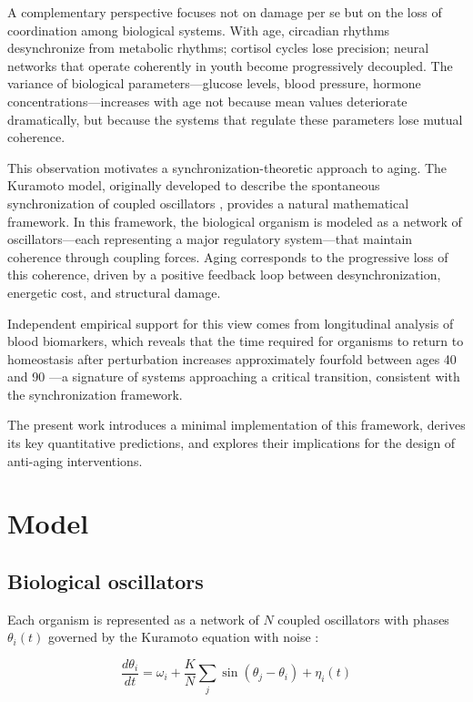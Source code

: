\documentclass[12pt]{article}
\begin{document}
A complementary perspective focuses not on damage per se but on the loss of
coordination among biological systems. With age, circadian rhythms desynchronize
from metabolic rhythms; cortisol cycles lose precision; neural networks that
operate coherently in youth become progressively decoupled. The variance of
biological parameters---glucose levels, blood pressure, hormone
concentrations---increases with age not because mean values deteriorate
dramatically, but because the systems that regulate these parameters lose mutual
coherence.

This observation motivates a synchronization-theoretic approach to aging. The
Kuramoto model, originally developed to describe the spontaneous synchronization
of coupled oscillators \citep{kuramoto1975}, provides a natural mathematical
framework. In this framework, the biological organism is modeled as a network of
oscillators---each representing a major regulatory system---that maintain
coherence through coupling forces. Aging corresponds to the progressive loss of
this coherence, driven by a positive feedback loop between desynchronization,
energetic cost, and structural damage.

Independent empirical support for this view comes from longitudinal analysis of
blood biomarkers, which reveals that the time required for organisms to return to
homeostasis after perturbation increases approximately fourfold between ages 40
and 90 \citep{pyrkov2021}---a signature of systems approaching a critical
transition, consistent with the synchronization framework.

The present work introduces a minimal implementation of this framework, derives
its key quantitative predictions, and explores their implications for the design
of anti-aging interventions.

\section{Model}

\subsection{Biological oscillators}

Each organism is represented as a network of $N$ coupled oscillators with phases
$\theta_i(t)$ governed by the Kuramoto equation with noise
\citep{kuramoto1975, strogatz2000}:

\begin{equation}
\frac{d\theta_i}{dt} = \omega_i + \frac{K}{N} \sum_j \sin(\theta_j - \theta_i) + \eta_i(t)
\end{equation}
\end{document}
